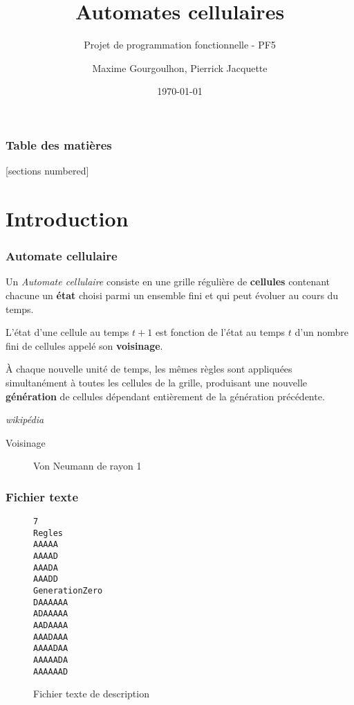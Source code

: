 \documentclass[10pt]{beamer}
\title{Automates cellulaires}
\subtitle{Projet de programmation fonctionnelle - PF5}
\date{\today}
\author{Maxime Gourgoulhon, Pierrick Jacquette}
\institute{Université Paris Diderot}
\begin{document}
\maketitle

\begin{frame}
  \frametitle{Table des matières}
  [sections numbered]
  \tableofcontents[hideallsubsections]
\end{frame}

\section{Introduction}

\begin{frame}[fragile]
	\frametitle{Automate cellulaire}
	
    Un \emph{Automate cellulaire} consiste en une grille régulière de \textbf{cellules} contenant chacune un \textbf{état} choisi parmi un ensemble fini et qui peut évoluer au cours du temps.
    
    L'état d'une cellule au temps $t+1$ est fonction de l'état au temps $t$ d'un nombre fini de cellules appelé son \textbf{voisinage}.
    
    À chaque nouvelle unité de temps, les mêmes règles sont appliquées \alert{simultanément} à toutes les cellules de la grille, produisant une nouvelle \textbf{génération} de cellules dépendant entièrement de la génération précédente.
    
    \hfill \emph{wikipédia}
\end{frame}

\begin{frame}{Voisinage}
\begin{figure}
	\caption{Von Neumann de rayon 1}
\end{figure}
\end{frame}

\begin{frame}[fragile]
\frametitle{Fichier texte}
\lstset{
  basicstyle=\footnotesize, frame=tb,
  xleftmargin=.2\textwidth, xrightmargin=.2\textwidth
}
\begin{figure}
\caption{Fichier texte de description}
\begin{lstlisting}
7
Regles
AAAAA
AAAAD
AAADA
AAADD
GenerationZero
DAAAAAA
ADAAAAA
AADAAAA
AAADAAA
AAAADAA
AAAAADA
AAAAAAD
\end{lstlisting}
\end{figure}
\end{frame}
\end{document}
